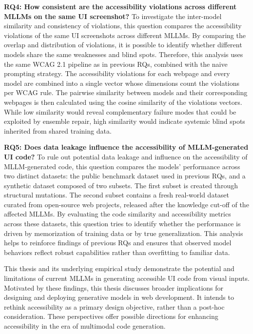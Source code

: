 \textbf{RQ4: How consistent are the accessibility violations across different MLLMs on the same UI screenshot?}
To investigate the inter-model similarity and consistency of violations, this question compares the 
accessibility violations of the same UI screenshots 
across different MLLMs. By comparing the overlap and 
distribution of violations, it is possible to identify 
whether different models share the same weaknesses and
blind spots. Therefore, this analysis uses the same WCAG 
2.1 pipeline as in previous RQs, combined with the naive prompting 
strategy. The accessibility violations for each webpage 
and every model are combined into a single vector whose 
dimensions count the violations per WCAG rule. The pairwise similarity 
between models and their corresponding webpages is then calculated 
using the cosine similarity of the violations vectors. While 
low similarity would reveal 
complementary failure modes that could be exploited by ensemble 
repair, high similarity would indicate systemic blind spots 
inherited from shared training data.\newline




\textbf{RQ5: Does data leakage influence the accessibility of MLLM-generated UI code?}
To rule out potential data leakage and influence on the accessibility 
of MLLM-generated code, this question compares the models' performance across
two distinct datasets: the public benchmark dataset used in previous 
RQs, and a synthetic dataset composed of two subsets. The first 
subset is created through structural mutations. The second subset contains
a fresh real-world dataset curated from open-source web projects, 
released after the knowledge cut-off of the affected MLLMs. By 
evaluating the code similarity and accessibility metrics across
these datasets, this question tries to identify whether the
performance is driven by memorization of training data or by
true generalization. This analysis helps to reinforce findings
of previous RQs and ensures that observed model behaviors reflect
robust capabilities rather than overfitting to familiar data.\newline

\noindent
This thesis and its underlying empirical study demonstrate the potential and 
limitations of current MLLMs in generating accessible UI code 
from visual inputs. 
Motivated by these findings, this thesis discusses broader implications
for designing and deploying generative models in web development. It 
intends to rethink accessibility as a primary design objective, rather than a 
post-hoc consideration. These perspectives offer possible directions for 
enhancing accessibility in the era of multimodal code generation.



